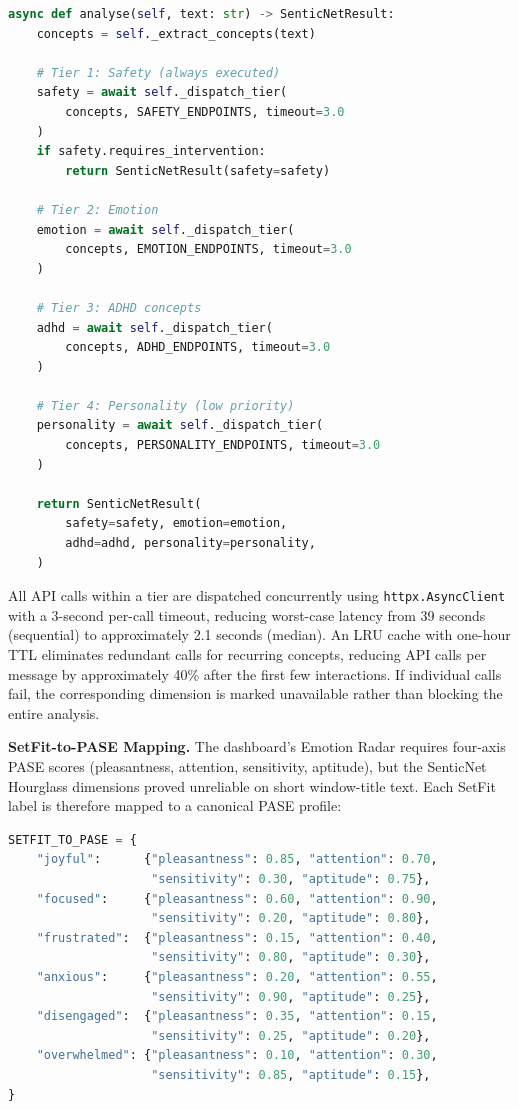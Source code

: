 \begin{lstlisting}[language=Python, caption={SenticNet four-tier cascade with async dispatch and early termination (abbreviated).}, label={lst:senticnet-cascade}]
async def analyse(self, text: str) -> SenticNetResult:
    concepts = self._extract_concepts(text)

    # Tier 1: Safety (always executed)
    safety = await self._dispatch_tier(
        concepts, SAFETY_ENDPOINTS, timeout=3.0
    )
    if safety.requires_intervention:
        return SenticNetResult(safety=safety)

    # Tier 2: Emotion
    emotion = await self._dispatch_tier(
        concepts, EMOTION_ENDPOINTS, timeout=3.0
    )

    # Tier 3: ADHD concepts
    adhd = await self._dispatch_tier(
        concepts, ADHD_ENDPOINTS, timeout=3.0
    )

    # Tier 4: Personality (low priority)
    personality = await self._dispatch_tier(
        concepts, PERSONALITY_ENDPOINTS, timeout=3.0
    )

    return SenticNetResult(
        safety=safety, emotion=emotion,
        adhd=adhd, personality=personality,
    )
\end{lstlisting}

All API calls within a tier are dispatched concurrently using \texttt{httpx.AsyncClient} with a 3-second per-call timeout, reducing worst-case latency from 39 seconds (sequential) to approximately 2.1 seconds (median). An LRU cache with one-hour TTL eliminates redundant calls for recurring concepts, reducing API calls per message by approximately 40\% after the first few interactions. If individual calls fail, the corresponding dimension is marked unavailable rather than blocking the entire analysis.

\textbf{SetFit-to-PASE Mapping.} The dashboard's Emotion Radar requires four-axis PASE scores (pleasantness, attention, sensitivity, aptitude), but the SenticNet Hourglass dimensions proved unreliable on short window-title text. Each SetFit label is therefore mapped to a canonical PASE profile:

\begin{lstlisting}[language=Python, caption={SetFit label to canonical PASE profile mapping.}, label={lst:setfit-pase}]
SETFIT_TO_PASE = {
    "joyful":      {"pleasantness": 0.85, "attention": 0.70,
                    "sensitivity": 0.30, "aptitude": 0.75},
    "focused":     {"pleasantness": 0.60, "attention": 0.90,
                    "sensitivity": 0.20, "aptitude": 0.80},
    "frustrated":  {"pleasantness": 0.15, "attention": 0.40,
                    "sensitivity": 0.80, "aptitude": 0.30},
    "anxious":     {"pleasantness": 0.20, "attention": 0.55,
                    "sensitivity": 0.90, "aptitude": 0.25},
    "disengaged":  {"pleasantness": 0.35, "attention": 0.15,
                    "sensitivity": 0.25, "aptitude": 0.20},
    "overwhelmed": {"pleasantness": 0.10, "attention": 0.30,
                    "sensitivity": 0.85, "aptitude": 0.15},
}
\end{lstlisting}

